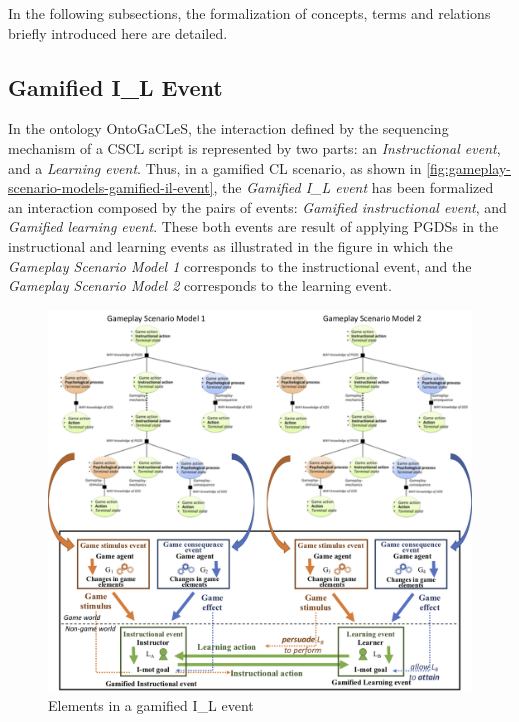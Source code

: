In the following subsections, the formalization of concepts, terms and relations briefly introduced here are detailed.

\subsection{Gamified I\_L Event}
\label{subsec:gamified-il-event}

In the ontology OntoGaCLeS, the interaction defined by the sequencing mechanism of a CSCL script is represented by two parts: an \emph{Instructional event}, and a \emph{Learning event}. Thus, in a gamified CL scenario, as shown in \autoref{fig:gameplay-scenario-models-gamified-il-event}, the \emph{Gamified I\_L event} has been formalized an interaction composed by the pairs of events: \emph{Gamified instructional event}, and \emph{Gamified learning event}. These both events are result of applying PGDSs in the instructional and learning events as illustrated in the figure in which the \emph{Gameplay Scenario Model 1} corresponds to the instructional event, and the \emph{Gameplay Scenario Model 2} corresponds to the learning event.

\begin{figure}[!htbp]
 \caption{Elements in a gamified I\_L event}
 \label{fig:gameplay-scenario-models-gamified-il-event}
 \centering
 \includegraphics[width=1\textwidth]{images/chap-ontogacles2/gameplay-scenario-models-gamified-il-event.png}
 \fautor
\end{figure}

